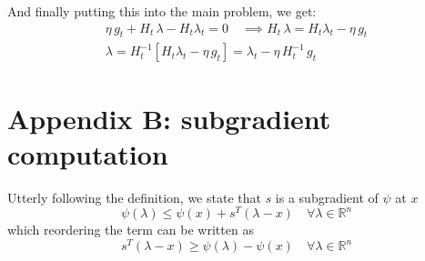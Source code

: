 \documentclass[notitlepage]{article}
\begin{document}
And finally putting this into the main problem, we get:
\begin{gather*}
  \eta\, g_t + H_t\, \lambda - H_t \lambda_t = 0 \quad \implies H_t\, \lambda = H_t \lambda_t - \eta\, g_t \\
  \lambda = H_t^{-1} \left[ H_t \lambda_t - \eta\, g_t \right] = \lambda_t - \eta\, H_t^{-1}\, g_t
\end{gather*}


\section{Appendix B: subgradient computation}
\label{sec:appendix_B}

Utterly following the definition, we state that $s$ is a subgradient of $\psi$ at $x$
\[
  \psi( \lambda ) \le \psi(x) + s^T (\lambda - x) \quad \forall \lambda \in \mathbb{R}^n  
\]
which reordering the term can be written as
\[
  s^T (\lambda - x) \ge \psi(\lambda) - \psi(x) \quad \forall \lambda \in \mathbb{R}^n  
\]
\end{document}
